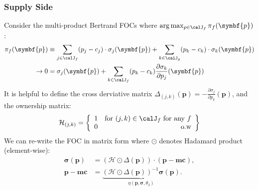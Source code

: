 \begin{frame}
\frametitle{Supply Side}
\small
Consider the multi-product Bertrand FOCs where $\arg \max_{p \in \calJ_f} \pi_f (\symbf{p})$:
{\begin{align*}
\pi_f (\symbf{p}) &\equiv \sum_{j \in \calJ_f} (p_j - c_j) \cdot \sigma_j(\symbf{p}) + \sum_{k \in \calJ_g} (p_k - c_k) \cdot \sigma_k(\symbf{p}) \\
\rightarrow 0&= \sigma_j(\symbf{p}) + \sum_{k \in \calJ_f} (p_k - c_k) \frac{\partial \sigma_{k}}{\partial p_j}(\symbf{p}) 
\end{align*}
}
It is helpful to define the \alert{cross derviative matrix} $\Delta_{(j,k)}(\symbf{p})  = - \frac{\partial \sigma_{j}}{\partial p_k}(\symbf{p})$, and the \alert{ownership matrix}:
\begin{align*}
\mathcal{H}_{(j,k)} = \left\{\begin{array}{lr}
          1 & \text{for }  (j,k) \in \calJ_f \text{ for any } f \\ 
      0 & \text{o.w}\\
        \end{array} \right\}
\end{align*}
We can re-write the FOC in matrix form where $\odot$ denotes Hadamard product (element-wise):
\begin{align*}
        \symbf{\sigma}(\symbf{p}) &= (\mathcal{H} \odot \Delta(\symbf{p})) \cdot (\symbf{p} - \symbf{mc}), \\
       \symbf{p}-\symbf{mc} &=  \underbrace{(\mathcal{H} \odot \Delta(\symbf{p}))^{-1} \symbf{\sigma}(\symbf{p})}_{\eta(\symbf{p},\symbf{\sigma},\theta_2)}.
\end{align*}
\end{frame}


